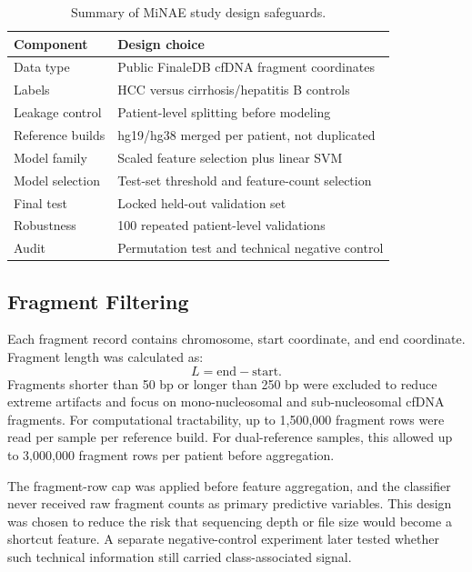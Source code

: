 \documentclass[conference]{IEEEtran}
\begin{document}
\begin{table}[t]
\centering
\caption{Summary of MiNAE study design safeguards.}
\label{tab:design}
\begin{tabular}{p{}p{}}
\toprule
Component & Design choice \\
\midrule
Data type & Public FinaleDB cfDNA fragment coordinates \\
Labels & HCC versus cirrhosis/hepatitis B controls \\
Leakage control & Patient-level splitting before modeling \\
Reference builds & hg19/hg38 merged per patient, not duplicated \\
Model family & Scaled feature selection plus linear SVM \\
Model selection & Test-set threshold and feature-count selection \\
Final test & Locked held-out validation set \\
Robustness & 100 repeated patient-level validations \\
Audit & Permutation test and technical negative control \\
\bottomrule
\end{tabular}
\end{table}

\subsection{Fragment Filtering}
Each fragment record contains chromosome, start coordinate, and end coordinate. Fragment length was calculated as:
\begin{equation}
    L = \mathrm{end} - \mathrm{start}.
\end{equation}
Fragments shorter than 50 bp or longer than 250 bp were excluded to reduce extreme artifacts and focus on mono-nucleosomal and sub-nucleosomal cfDNA fragments. For computational tractability, up to 1,500,000 fragment rows were read per sample per reference build. For dual-reference samples, this allowed up to 3,000,000 fragment rows per patient before aggregation.

The fragment-row cap was applied before feature aggregation, and the classifier never received raw fragment counts as primary predictive variables. This design was chosen to reduce the risk that sequencing depth or file size would become a shortcut feature. A separate negative-control experiment later tested whether such technical information still carried class-associated signal.
\end{document}
